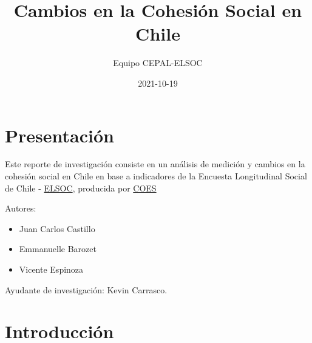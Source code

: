 \documentclass[
  12pt,
]{book}
\title{Cambios en la Cohesión Social en Chile}
\author{Equipo CEPAL-ELSOC}
\date{2021-10-19}
\providecommand{\tightlist}{%
  \setlength{\itemsep}{0pt}\setlength{\parskip}{0pt}}
\begin{document}
\maketitle

{
\hypersetup{linkcolor=}
\setcounter{tocdepth}{1}
\tableofcontents
}
\listoffigures
\listoftables
{}
\hypertarget{presentaciuxf3n}{%
\chapter*{Presentación}\label{presentaciuxf3n}}

Este reporte de investigación consiste en un análisis de medición y cambios en la cohesión social en Chile en base a indicadores de la Encuesta Longitudinal Social de Chile - \href{https://coes.cl/encuesta-panel/}{ELSOC}, producida por \href{https://coes.cl/}{COES}

Autores:

\begin{itemize}
\tightlist
\item
  Juan Carlos Castillo
\item
  Emmanuelle Barozet
\item
  Vicente Espinoza
\end{itemize}

Ayudante de investigación: Kevin Carrasco.

\hypertarget{introducciuxf3n}{%
\chapter*{Introducción}\label{introducciuxf3n}}
\end{document}
